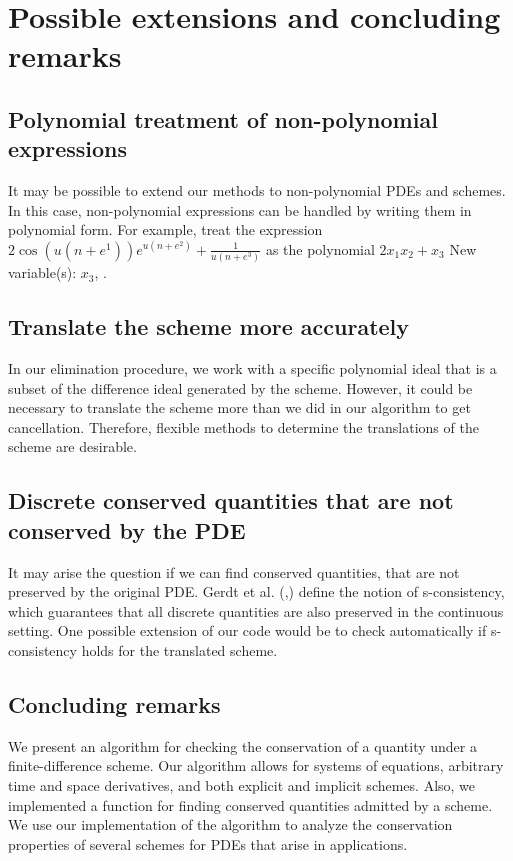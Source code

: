 \documentclass[sigconf,twocolumn]{acmart}
\newcommand{\1}{{\chi}}
\numberwithin{equation}{section}
\theoremstyle{thmlemcorr}
\numberwithin{theorem}{section}
\theoremstyle{thmlemcorr*}
\theoremstyle{defi}
\theoremstyle{remexample}
\theoremstyle{ass}
\begin{document}
\section{Possible extensions and concluding remarks}
\subsection*{Polynomial treatment of non-polynomial expressions}
It may be possible to extend our methods to non-polynomial PDEs and schemes. In this case, non-polynomial expressions can be handled by writing them in polynomial form. For example, treat the expression \(2\cos(u(n+e^1))e^{u(n+e^2)}+\frac{1}{u(n+e^3)}\)
as the polynomial \(2x_1x_2+x_3\)
{\color{blue} New variable(s): \(x_3\),  }
.
\subsection*{Translate the scheme more accurately}
In our elimination procedure, we work with a specific polynomial ideal that is a subset of the difference ideal generated by the scheme. However, it could be necessary to translate the scheme more than we did in our algorithm to get cancellation. Therefore, flexible methods to determine the translations of the scheme are desirable.
\subsection*{Discrete conserved quantities that are not conserved by the PDE}
It may arise the question if we can find conserved quantities, that are not preserved by the original PDE. Gerdt et al. (\cite{gerdt10},\cite{gerdt12}) define the notion of s-consistency, which guarantees that all discrete quantities are also preserved in the continuous setting. One possible extension of our code would be to check automatically if s-consistency holds for the translated scheme.
\subsection*{Concluding remarks}
We present an algorithm for checking the conservation of a quantity under a finite-difference scheme. Our algorithm allows for systems of equations, arbitrary time and space derivatives, and both explicit and implicit schemes. Also, we implemented a function for finding conserved quantities admitted by a scheme. We use our implementation of the algorithm to analyze the conservation properties of several schemes for PDEs that arise in applications.



\end{document}

